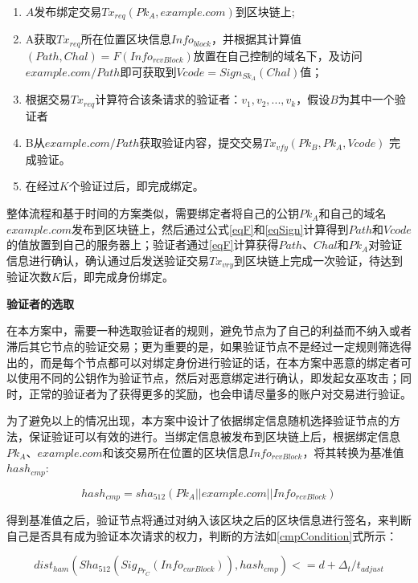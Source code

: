 \begin{enumerate}
	\item $A$发布绑定交易$Tx_{req}(Pk_A, example.com)$到区块链上;
	\item  A获取$Tx_{req}$所在位置区块信息$Info_{block}$，并根据其计算值$(Path, Chal) = F(Info_{rcvBlock})$放置在自己控制的域名下，及访问$example.com/Path$即可获取到$Vcode = Sign_{Sk_A}(Chal)$值；
	\item 根据交易$Tx_{req}$计算符合该条请求的验证者：${v_1, v_2, ... , v_k}$，假设$B$为其中一个验证者
	\item B从$example.com/Path$获取验证内容，提交交易$Tx_{vfy}(Pk_B, Pk_A, Vcode)$ 完成验证。
	\item 在经过$K$个验证过后，即完成绑定。
\end{enumerate}

整体流程和基于时间的方案类似，需要绑定者将自己的公钥$Pk_A$和自己的域名$example.com$发布到区块链上，然后通过公式\eqref{eqF}和\eqref{eqSign}计算得到$Path$和$Vcode$的值放置到自己的服务器上；验证者通过\eqref{eqF}计算获得$Path$、$Chal$和$Pk_A$对验证信息进行确认，确认通过后发送验证交易$Tx_{vry}$到区块链上完成一次验证，待达到验证次数$K$后，即完成身份绑定。

\noindent\textbf{验证者的选取}

在本方案中，需要一种选取验证者的规则，避免节点为了自己的利益而不纳入或者滞后其它节点的验证交易；更为重要的是，如果验证节点不是经过一定规则筛选得出的，而是每个节点都可以对绑定身份进行验证的话，在本方案中恶意的绑定者可以使用不同的公钥作为验证节点，然后对恶意绑定进行确认，即发起女巫攻击；同时，正常的验证者为了获得更多的奖励，也会申请尽量多的账户对交易进行验证。

为了避免以上的情况出现，本方案中设计了依据绑定信息随机选择验证节点的方法，保证验证可以有效的进行。当绑定信息被发布到区块链上后，根据绑定信息$Pk_A$、$example.com$和该交易所在位置的区块信息$Info_{rcvBlock}$，将其转换为基准值$hash_{cmp}$:

\begin{equation}\label{eqGenCmpPk}
hash_{cmp} = sha_{512}(Pk_A||example.com||Info_{rcvBlock})
\end{equation}

得到基准值之后，验证节点将通过对纳入该区块之后的区块信息进行签名，来判断自己是否具有成为验证本次请求的权力，判断的方法如\ref{cmpCondition}式所示：


\begin{equation}\label{cmpCondition}
dist_{ham}(Sha_{512}(Sig_{Pr_C}(Info_{curBlock})), hash_{cmp}) <= d + \Delta_t / t_{adjust}
\end{equation}

